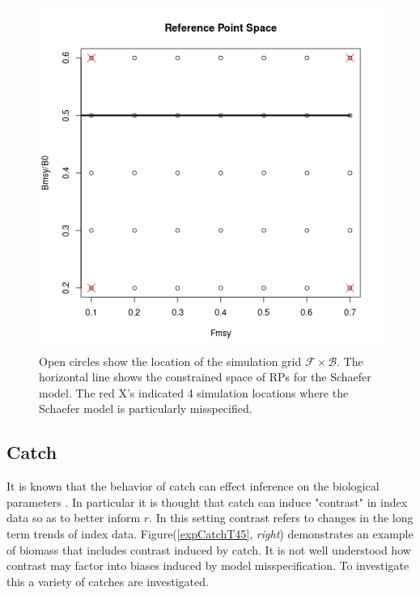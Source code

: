 \documentclass[12pt]{article}
\begin{document}
%
\begin{figure}[h!]
\begin{minipage}[h!]{0.53\textwidth}
\includegraphics[height=0.37\textheight]{../present/shaeferDat.png}
\end{minipage}
\begin{minipage}[h!]{0.48\textwidth}
\caption{\label{rpGrid}
Open circles show the location of the simulation grid $\mathcal{F}\times\mathcal{B}$.
The horizontal line shows the constrained space of RPs for the Schaefer model.
The red X's indicated 4 simulation locations where the Schaefer model is particularly 
misspecified.
}
\end{minipage}
\end{figure}

%
\clearpage
\subsection{Catch \label{catch}}


%
It is known that the behavior of catch can effect inference on the biological 
parameters . %
In particular it is thought that catch can induce "contrast" in index data
so as to better inform $r$. In this setting contrast refers to changes in the 
long term trends of index data. Figure(\ref{expCatchT45}, \emph{right}) demonstrates an 
example of biomass that includes contrast induced by catch. It is not well 
understood how contrast may factor into biases induced by model misspecification. 
To investigate this a variety of catches are investigated.
\end{document}
